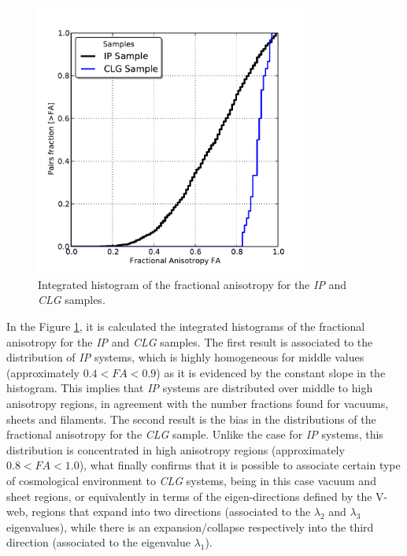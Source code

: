 \begin{figure}[htbp]
	\centering
	\includegraphics[trim = 0mm 0mm 0mm 10mm, clip, width=0.8\textwidth]
	{./figures/4_results/CLG_FA_Hist.pdf}
	
	\caption{\small{Integrated histogram of the fractional anisotropy for
	the \textit{IP} and \textit{CLG} samples.}}
	\label{fig:FA_samples}
\end{figure}


In the Figure \ref{fig:FA_samples}, it is calculated the integrated 
histograms of the fractional anisotropy for the \textit{IP} and 
\textit{CLG} samples. The first result is associated to the distribution
of \textit{IP} systems, which is highly homogeneous for middle values
(approximately $0.4 < FA < 0.9$) as it is evidenced by the constant slope
in the histogram. This implies that \textit{IP} systems are distributed
over middle to high anisotropy regions, in agreement with the number 
fractions found for vacuums, sheets and filaments. The second result is
the bias in the distributions of the fractional anisotropy for the 
\textit{CLG} sample. Unlike the case for \textit{IP} systems, this
distribution is concentrated in high anisotropy regions (approximately 
$0.8 < FA < 1.0$), what finally confirms that it is possible to associate 
certain type of cosmological environment to \textit{CLG} systems, 
being in this case vacuum and sheet regions, or equivalently in terms of
the eigen-directions defined by the V-web, regions that expand into two 
directions (associated to the $\lambda_2$ and $\lambda_3$ eigenvalues),
while there is an expansion/collapse respectively into the third direction
(associated to the eigenvalue $\lambda_1$).


